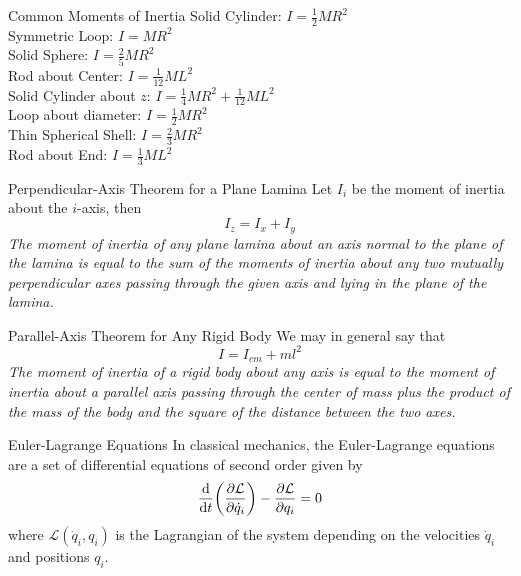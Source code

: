 \documentclass[avery5371,grid]{flashcards}
\begin{document}
\begin{flashcard}[Formula]{Common Moments of Inertia}
	Solid Cylinder: $I = \tfrac{1}{2}MR^2$\\
	Symmetric Loop: $I = MR^2$\\
	Solid Sphere: $I = \tfrac{2}{5}MR^2$\\
	Rod about Center: $I = \tfrac{1}{12}M L^2$\\
	Solid Cylinder about $z$: $I = \tfrac{1}{4}MR^2+\tfrac{1}{12}ML^2$\\
	Loop about diameter: $I = \tfrac{1}{2}MR^2$\\
	Thin Spherical Shell: $I = \tfrac{2}{3}MR^2$\\
	Rod about End: $I = \frac{1}{3}ML^2$\\
\end{flashcard}

\begin{flashcard}[Theory]{Perpendicular-Axis Theorem for a Plane Lamina}
	Let $I_i$ be the moment of inertia about the $i$-axis, then
	\begin{equation*}
		I_z = I_x + I_y
	\end{equation*}
	\textit{The moment of inertia of any plane lamina about an axis normal to the plane of the lamina is equal to the sum of the moments of inertia about any two mutually perpendicular axes passing through the given axis and lying in the plane of the lamina.}
\end{flashcard}

\begin{flashcard}[Theory]{Parallel-Axis Theorem for Any Rigid Body}
	We may in general say that
	\begin{equation*}
		I = I_{cm} + m l^2
	\end{equation*}
	\textit{The moment of inertia of a rigid body about any axis is equal to the moment of inertia about a parallel axis passing through the center of mass plus the product of the mass of the body and the square of the distance between the two axes.}
\end{flashcard}

\begin{flashcard}[Definition]{Euler-Lagrange Equations}
	In classical mechanics, the Euler-Lagrange equations are a set of differential equations of second order given by
	\begin{equation*}
		\dv{t}\qty(\pdv{\mathcal{L}}{\dot{q}_i}) - \pdv{\mathcal{L}}{q_i}=0
	\end{equation*}
	where $\mathcal{L}(\dot{q}_i,q_i)$ is the Lagrangian of the system depending on the velocities $\dot{q}_i$ and positions $q_i$.
\end{flashcard}
\end{document}

